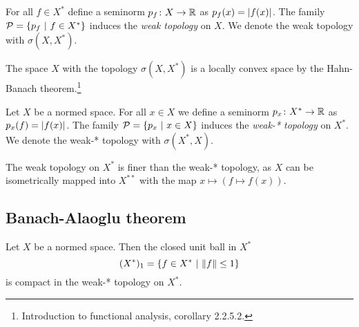 \begin{definicija}
For all $f \in X^*$ define a seminorm $p_f \colon X \to \mathbb{R}$ as
$p_f(x) = \left\lvert f(x)\right\rvert$. The family
$\mathcal{P} = \left\{p_f~\middle\vert~f \in X^*\right\}$ induces the
\emph{weak topology} on $X$. We denote the
weak topology with $\sigma(X, X^*)$.
\end{definicija}

\begin{opomba}
The space $X$ with the topology $\sigma(X, X^*)$ is a locally
convex space by the Hahn-Banach theorem.\footnote{Introduction to
functional analysis, corollary 2.2.5.2.}
\end{opomba}

\begin{definicija}
Let $X$ be a normed space. For all $x \in X$ we define a seminorm
$p_x \colon X^* \to \mathbb{R}$ as $p_x(f) = \left\lvert f(x)\right\rvert$. The family
$\mathcal{P} = \left\{p_x~\middle\vert~x \in X\right\}$ induces the
\emph{weak-* topology} on $X^*$. We denote
the weak-* topology with $\sigma(X^*, X)$.
\end{definicija}

\begin{opomba}
The weak topology on $X^*$ is finer than the weak-* topology, as
$X$ can be isometrically mapped into $X^{**}$ with the map
$x \mapsto (f \mapsto f(x))$.
\end{opomba}

\newpage

\subsection{Banach-Alaoglu theorem}

\begin{izrek}
Let $X$ be a normed space. Then the closed unit ball in $X^*$
\[
(X^*)_1 = \left\{f \in X^*~\middle\vert~\left\lVert f\right\rVert \leq 1\right\}
\]
is compact in the weak-* topology on $X^*$.
\end{izrek}


